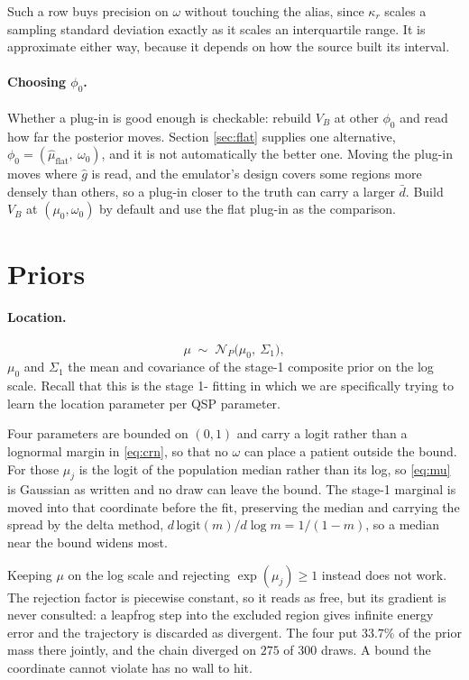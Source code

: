\documentclass[11pt]{article}
\newcommand{\Ncal}{\mathcal{N}}
\begin{document}
Such a row buys precision on $\omega$ without touching the alias, since $\kappa_r$
scales a sampling standard deviation exactly as it scales an interquartile range.
It is approximate either way, because it depends on how the source built its
interval.

\paragraph{Choosing $\phi_0$.} Whether a plug-in is good enough is checkable:
rebuild $V_B$ at other $\phi_0$ and read how far the posterior moves. Section
\ref{sec:flat} supplies one alternative, $\phi_0=(\hat\mu_{\text{flat}},\
\omega_0)$, and it is not automatically the better one. Moving the plug-in moves
where $\widehat g$ is read, and the emulator's design covers some regions more
densely than others, so a plug-in closer to the truth can carry a larger
$\bar d$. Build $V_B$ at $(\mu_0,\omega_0)$ by default and use the flat plug-in
as the comparison.

\section{Priors}

\paragraph{Location.}
\begin{equation}
\mu \;\sim\; \Ncal_P\big(\mu_0,\ \Sigma_1\big),
\label{eq:mu}
\end{equation}
$\mu_0$ and $\Sigma_1$ the mean and covariance of the stage-1 composite prior on
the log scale. Recall that this is the stage 1- fitting in which we are specifically trying to learn the location parameter per QSP parameter.

Four parameters are bounded on $(0,1)$ and carry a logit rather than a lognormal
margin in \eqref{eq:crn}, so that no $\omega$ can place a patient outside the
bound. For those $\mu_j$ is the logit of the population median rather than its
log, so \eqref{eq:mu} is Gaussian as written and no draw can leave the bound. The
stage-1 marginal is moved into that coordinate before the fit, preserving the
median and carrying the spread by the delta method,
$d\,\mathrm{logit}(m)/d\log m = 1/(1-m)$, so a median near the bound widens most.

Keeping $\mu$ on the log scale and rejecting $\exp(\mu_j)\ge1$ instead does not
work. The rejection factor is piecewise constant, so it reads as free, but its
gradient is never consulted: a leapfrog step into the excluded region gives
infinite energy error and the trajectory is discarded as divergent. The four put
$33.7\%$ of the prior mass there jointly, and the chain diverged on $275$ of
$300$ draws. A bound the coordinate cannot violate has no wall to hit.
\end{document}
